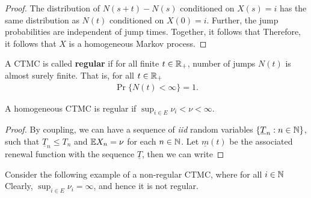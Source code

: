 \documentclass[a4paper,10pt,english]{article}
\begin{document}
\begin{proof}
The distribution of $N(s+t) - N(s)$ conditioned on $X(s) = i$ has 
the same distribution as $N(t)$ conditioned on $X(0) = i$. 
Further, the jump probabilities are independent of jump times. 
Together, it follows that
Therefore, it follows that $X$ is a homogeneous Markov process. 
\end{proof}
A CTMC is called \textbf{regular} if for all finite $t \in \mathbb{R}_+$, number of jumps $N(t)$ is almost surely finite. 
That is, for all $t \in \mathbb{R}_+$
\begin{align*}
\Pr\{ N(t) < \infty \} = 1.
\end{align*} 
\begin{lem} 
A homogeneous CTMC is regular if $\sup_{i \in E} \nu_i < \nu < \infty$. 
\end{lem}
\begin{proof}
By coupling, we can have a sequence of \textit{iid} random variables $\{\underline{T}_n: n \in \mathbb{N}\}$, 
such that $\underline{T}_n \leq T_n$ and $\mathbb{E} X_n = \nu$ for each $n \in \mathbb{N}$. 
Let $\underline{m}(t)$ be the associated renewal function with the sequence $\underline{T}$, 
then we can write 
\end{proof}
\begin{shaded*}
Consider the following example of a non-regular CTMC, where for all $i \in \mathbb{N}$
Clearly, $\sup_{i \in E}\nu_i = \infty$, and hence it is not regular.
\end{shaded*}
\end{document}
